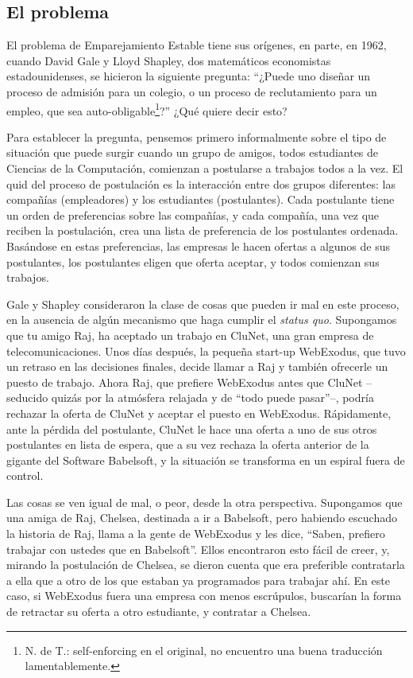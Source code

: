 \documentclass[a4paper, 12pt]{book}
\theoremstyle{dotless}
\begin{document}
\subsection*{El problema}

El problema de Emparejamiento Estable tiene sus orígenes, en parte, en 1962, cuando David Gale y Lloyd Shapley, dos matemáticos economistas estadounidenses, se hicieron la siguiente pregunta: ``¿Puede uno diseñar un proceso de admisión para un colegio, o un proceso de reclutamiento para un empleo, que sea auto-obligable\footnote{N. de T.: self-enforcing en el original, no encuentro una buena traducción lamentablemente.}?''  ¿Qué quiere decir esto?

Para establecer la pregunta, pensemos primero informalmente sobre el tipo de situación que puede surgir cuando un grupo de amigos, todos estudiantes de Ciencias de la Computación, comienzan a postularse a trabajos todos a la vez. El quid del proceso de postulación es la interacción entre dos grupos diferentes: las compañías (empleadores) y los estudiantes (postulantes). Cada postulante tiene un orden de preferencias sobre las compañías, y cada compañía, una vez que reciben la postulación, crea una lista de preferencia de los postulantes ordenada. Basándose en estas preferencias, las empresas le hacen ofertas a algunos de sus postulantes, los postulantes eligen que oferta aceptar, y todos comienzan sus trabajos.  

Gale y Shapley consideraron la clase de cosas que pueden ir mal en este proceso, en la ausencia de algún mecanismo que haga cumplir el \textit{status quo}. Supongamos que tu amigo Raj, ha aceptado un trabajo en CluNet, una gran empresa de telecomunicaciones. Unos días después, la pequeña start-up WebExodus, que tuvo un retraso en las decisiones finales, decide llamar a Raj y también ofrecerle un puesto de trabajo. Ahora Raj, que prefiere WebExodus antes que CluNet -- seducido quizás por la atmósfera relajada y de ``todo puede pasar''--, podría rechazar la oferta de CluNet y aceptar el puesto en WebExodus. Rápidamente, ante la pérdida del postulante, CluNet le hace una oferta a uno de sus otros postulantes en lista de espera, que a su vez rechaza la oferta anterior de la gigante del Software Babelsoft, y la situación se transforma en un espiral fuera de control.

Las cosas se ven igual de mal, o peor, desde la otra perspectiva. Supongamos que una amiga de Raj, Chelsea, destinada a ir a Babelsoft, pero habiendo escuchado la historia de Raj, llama a la gente de WebExodus y les dice, ``Saben, prefiero trabajar con ustedes que en Babelsoft''. Ellos encontraron esto fácil de creer, y, mirando la postulación de Chelsea, se dieron cuenta que era preferible contratarla a ella que a otro de los que estaban ya programados para trabajar ahí. En este caso, si WebExodus fuera una empresa con menos escrúpulos, buscarían la forma de retractar su oferta a otro estudiante, y contratar a Chelsea.
\end{document}
